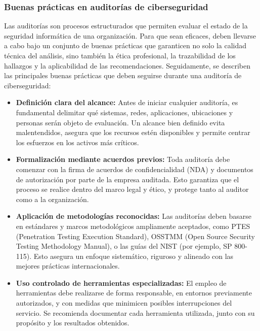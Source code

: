 \documentclass[a4paper, 11pt]{article}
\begin{document}
\subsubsection{Buenas prácticas en auditorías de ciberseguridad}

Las auditorías son procesos estructurados que permiten evaluar el estado de la seguridad informática de una organización. Para que 
sean eficaces, deben llevarse a cabo bajo un conjunto de buenas prácticas que garanticen no solo la calidad técnica del análisis, sino también la ética profesional, 
la trazabilidad de los hallazgos y la aplicabilidad de las recomendaciones. Seguidamente, se describen las principales buenas prácticas que deben seguirse durante una auditoría de ciberseguridad:

\begin{itemize}

    \item \textbf{Definición clara del alcance:}  
    Antes de iniciar cualquier auditoría, es fundamental delimitar qué sistemas, redes, aplicaciones, ubicaciones y personas serán objeto de evaluación. Un alcance bien definido evita malentendidos, asegura que los recursos estén disponibles y permite centrar los esfuerzos en los activos más críticos.

    \item \textbf{Formalización mediante acuerdos previos:}  
    Toda auditoría debe comenzar con la firma de acuerdos de confidencialidad (NDA) y documentos de autorización por parte de la empresa auditada. Esto garantiza que el proceso se realice dentro del marco legal y ético, y protege tanto al auditor como a la organización.

    \item \textbf{Aplicación de metodologías reconocidas:}  
    Las auditorías deben basarse en estándares y marcos metodológicos ampliamente aceptados, como PTES (Penetration Testing Execution Standard), OSSTMM (Open Source Security Testing Methodology Manual), o las guías del NIST (por ejemplo, SP 800-115). Esto asegura un enfoque sistemático, riguroso y alineado con las mejores prácticas internacionales.

    \item \textbf{Uso controlado de herramientas especializadas:}  
    El empleo de herramientas debe realizarse de forma responsable, en entornos previamente autorizados, y con medidas que minimicen posibles interrupciones del servicio. Se recomienda documentar cada herramienta utilizada, junto con su propósito y los resultados obtenidos.


\end{itemize}
\end{document}
